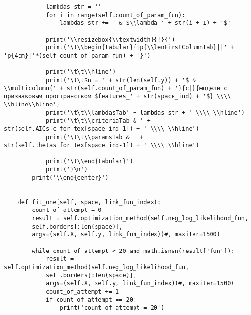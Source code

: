 \begin{verbatim}
            lambdas_str = ''
            for i in range(self.count_of_param_fun):
                lambdas_str += ' & $\\lambda_' + str(i + 1) + '$'
            
            print('\\resizebox{\\textwidth}{!}{')
            print('\t\\begin{tabular}{|p{\\lenFirstColumnTab}||' + 'p{4cm}|'*(self.count_of_param_fun) + '}')
            
            print('\t\t\\hline')
            print('\t\t$n = ' + str(len(self.y)) + '$ & \\multicolumn{' + str(self.count_of_param_fun) + '}{c|}{модели с признаковым пространством $features_' + str(space_ind) + '$} \\\\ \\hline\\hline')
            print('\t\t\\lambdasTab' + lambdas_str + ' \\\\ \\hline')
            print('\t\t\\criteriaTab & ' + str(self.AICs_c_for_tex[space_ind-1]) + ' \\\\ \\hline')
            print('\t\t\\paramsTab & ' + str(self.thetas_for_tex[space_ind-1]) + ' \\\\ \\hline')
            
            print('\t\\end{tabular}')
            print('}\n')
        print('\\end{center}')
    
    
    def fit_one(self, space, link_fun_index):
        count_of_attempt = 0
        result = self.optimization_method(self.neg_log_likelihood_fun,
        self.borders[:len(space)],
        args=(self.X, self.y, link_fun_index))#, maxiter=1500)
        
        while count_of_attempt < 20 and math.isnan(result['fun']):
            result = self.optimization_method(self.neg_log_likelihood_fun,
            self.borders[:len(space)],
            args=(self.X, self.y, link_fun_index))#, maxiter=1500)
            count_of_attempt += 1
            if count_of_attempt == 20:
                print('count_of_attempt = 20')
        

\end{verbatim}
